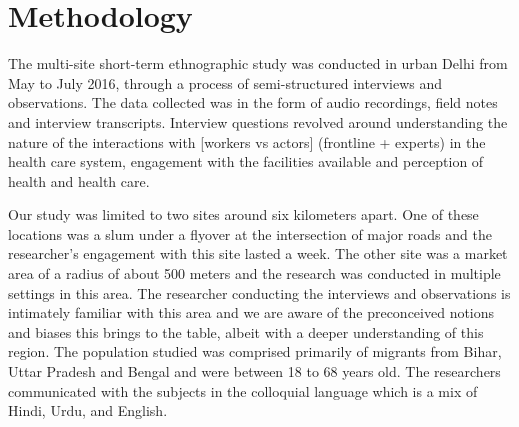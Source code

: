 \section{Methodology}

\begin{comment}
This should tell the story of what you did, and the single most important point is to show that you were reflective, rigorous, ethical, sound in your research. 
Start with where you conducted the study. Was there one site or many? How long was your (the authors’) engagement with this site? What was the nature of the engagement? And remember to anonymize by default.
Say what methods you used and who you studied. How long were your interviews? What kinds of questions did you ask? Did you use an interpreter? Who were these people? How old?
Add a paragraph on who the authors are and what they bring to the table. Say what their biases might have been that could be limitations of this work. Was there access you could not get? 
How did you analyze the data? If you used grounded theory, whose version of grounded theory did you use? Who was responsible for the analysis? 
Finally, there are lots of papers that have a decent write-up for methodology. Find a researcher you like and read up on the Methodology section.
\end{comment}

The multi-site short-term ethnographic study was conducted in urban Delhi from May to July 2016, through a process of semi-structured interviews and observations. The data collected was in the form of audio recordings, field notes and interview transcripts. Interview questions revolved around understanding the nature of the interactions with [workers vs actors] (frontline + experts) in the health care system, engagement with the facilities available and perception of health and health care.

Our study was limited to two sites around six kilometers apart. One of these locations was a slum under a flyover at the intersection of major roads and the researcher's engagement with this site lasted a week. The other site was a market area of a radius of about 500 meters and the research was conducted in multiple settings in this area. 
The researcher conducting the interviews and observations is intimately familiar with this area and we are aware of the preconceived notions and biases this brings to the table, albeit with a deeper understanding of this region.
The population studied was comprised primarily of migrants from Bihar, Uttar Pradesh and Bengal 
and were between 18 to 68 years old. The researchers communicated with the subjects in the colloquial language which is a mix of Hindi, Urdu, and English.

